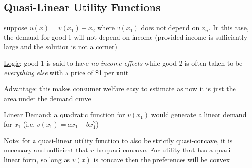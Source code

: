 \documentclass{article}
\begin{document}
\subsection{Quasi-Linear Utility Functions}
 suppose $u(x) = v(x_{1}) + x_{2}$ where $v(x_{1})$ does not depend on $x_{n}$. In this case, the demand for good 1 will not depend on income (provided income is sufficiently large and the solution is not a corner) \par \vspace{0.3em}
  \underline{Logic}: good 1 is said to have \textit{no-income effects} while good 2 is often taken to be \textit{everything else} with a price of \$1 per unit
  \par
  \underline{Advantage}: this makes consumer welfare easy to estimate as now it is just the area under the demand curve
  \par
  \underline{Linear Demand}: a quadratic function for $v(x_{1})$ would generate a linear demand for $x_{1}$ (i.e. $v(x_{1}) = ax_{1} - bx_{1}^{2}$)
  \par
  \underline{Note}: for a quasi-linear utility function to also be strictly quasi-concave, it is necessary and sufficient that $v$ be quasi-concave. For utility that has a quasi-linear form, so long as $v(x)$ is concave then the preferences will be convex
  \par
\vspace{6mm}
\end{document}

